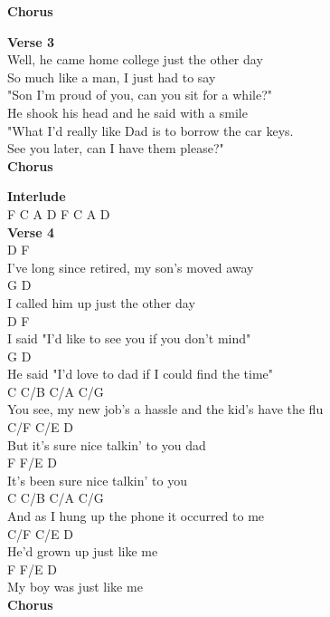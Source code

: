 \documentclass[a4paper]{article}
\begin{document}
{{        }
        \textbf{Chorus}
        ~\\
        {
            \cutive
            \obeyspaces

        }
        \textbf{Verse 3}
        ~\\
        {
            \cutive
            \obeyspaces
Well, he came home college just the other day
\\
So much like a man, I just had to say
\\
"Son I'm proud of you, can you sit for a while?"
\\
He shook his head and he said with a smile
\\
"What I'd really like Dad is to borrow the car keys.
\\
  See you later, can I have them please?"
\\

        }
        \textbf{Chorus}
        ~\\
        {
            \cutive
            \obeyspaces

        }
        \textbf{Interlude}
        ~\\
        {
            \cutive
            \obeyspaces
F C A D        F C A D
\\

        }
        \textbf{Verse 4}
        ~\\
        {
            \cutive
            \obeyspaces
D                            F
\\
I've long since retired, my son's moved away
\\
G                 D
\\
I called him up just the other day
\\
D                                F
\\
I said "I'd like to see you if you don't mind"
\\
G                         D
\\
He said "I'd love to dad if I could find the time"
\\
         C                 C/B          C/A         C/G
\\
You see, my new job's a hassle and the kid's have the flu
\\
C/F              C/E         D
\\
But it's sure nice talkin' to you dad
\\
F           F/E             D
\\
It's been sure nice talkin' to you
\\
C                C/B         C/A        C/G
\\
And as I hung up the phone it occurred to me
\\
C/F        C/E         D
\\
He'd grown up just like me
\\
F         F/E       D
\\
My boy was just like me
\\

        }
        \textbf{Chorus}
        ~\\
        {
            \cutive
            \obeyspaces

        }
    }
\end{document}
